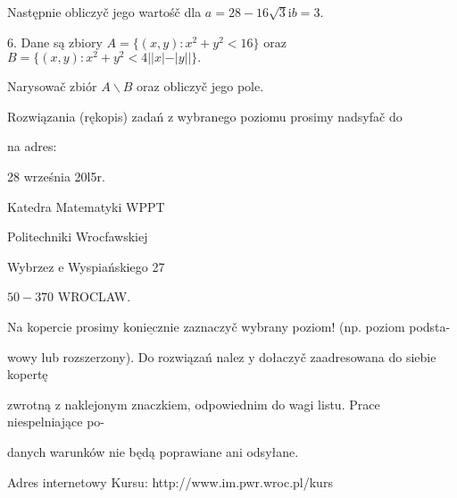 \documentclass[a4paper,12pt]{article}
\begin{document}
Następnie obliczyč jego wartośč dla $a=28-16\sqrt{3}\mathrm{i}b=3.$

6. Dane są zbiory $A=\{(x,y):x^{2}+y^{2}<16\}$ oraz $B=\{(x,y):x^{2}+y^{2}<4||x|-|y||\}.$

Narysowač zbiór $A\backslash B$ oraz obliczyč jego pole.

Rozwiązania (rękopis) zadań z wybranego poziomu prosimy nadsyfač do

na adres:

28 września 20l5r.

Katedra Matematyki WPPT

Politechniki Wrocfawskiej

Wybrzez $\mathrm{e}$ Wyspiańskiego 27

$50-370$ WROCLAW.

Na kopercie prosimy $\underline{\mathrm{k}\mathrm{o}\mathrm{n}\mathrm{i}\mathrm{e}\mathrm{c}\mathrm{z}\mathrm{n}\mathrm{i}\mathrm{e}}$ zaznaczyč wybrany poziom! (np. poziom podsta-

wowy lub rozszerzony). Do rozwiązań nalez $\mathrm{y}$ dołaczyč zaadresowana do siebie kopertę

zwrotną $\mathrm{z}$ naklejonym znaczkiem, odpowiednim do wagi listu. Prace niespelniające po-

danych warunków nie będą poprawiane ani odsyłane.

Adres internetowy Kursu: http://www.im.pwr.wroc.pl/kurs
\end{document}
